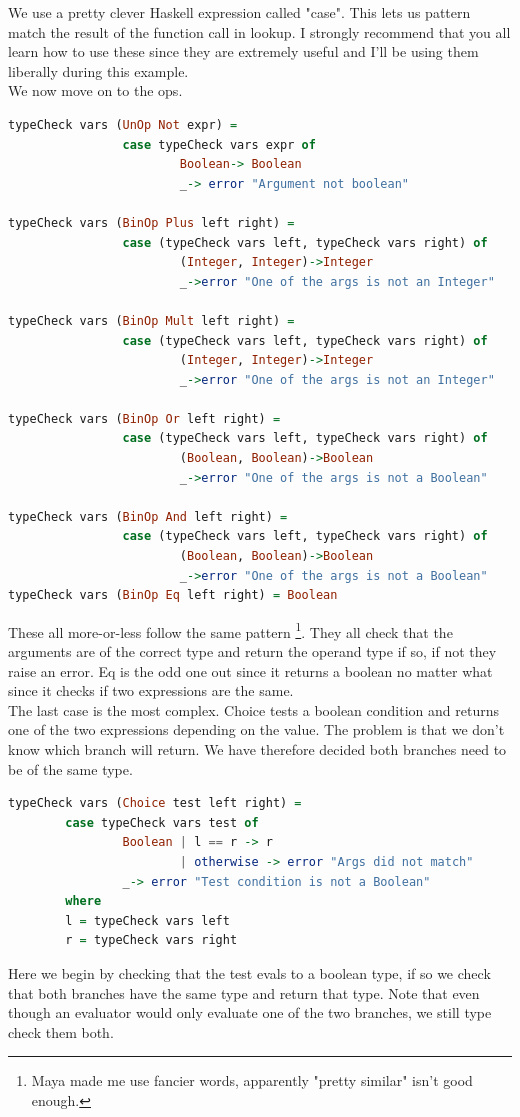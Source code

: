 \documentclass[tikz, border=5mm]{article}
\begin{document}
            We use a pretty clever Haskell expression called "case". This lets us pattern match the result of the function call in lookup. 
            I strongly recommend that you all learn how to use these since they are extremely useful and I'll be using them liberally during this example.\\
            We now move on to the ops. 
            \begin{lstlisting}[language=Haskell]
typeCheck vars (UnOp Not expr) = 
                case typeCheck vars expr of
                        Boolean-> Boolean 
                        _-> error "Argument not boolean"

typeCheck vars (BinOp Plus left right) = 
                case (typeCheck vars left, typeCheck vars right) of
                        (Integer, Integer)->Integer
                        _->error "One of the args is not an Integer"

typeCheck vars (BinOp Mult left right) = 
                case (typeCheck vars left, typeCheck vars right) of
                        (Integer, Integer)->Integer
                        _->error "One of the args is not an Integer"

typeCheck vars (BinOp Or left right) = 
                case (typeCheck vars left, typeCheck vars right) of
                        (Boolean, Boolean)->Boolean
                        _->error "One of the args is not a Boolean"

typeCheck vars (BinOp And left right) = 
                case (typeCheck vars left, typeCheck vars right) of
                        (Boolean, Boolean)->Boolean
                        _->error "One of the args is not a Boolean"
typeCheck vars (BinOp Eq left right) = Boolean
            \end{lstlisting}
            These all more-or-less follow the same pattern \footnote{Maya made me use fancier words, apparently "pretty similar" isn't good enough.}.
            They all check that the arguments are of the correct type and return the operand type if so, if not they raise an error.
            Eq is the odd one out since it returns a boolean no matter what since it checks if two expressions are the same.\\
            The last case is the most complex. Choice tests a boolean condition and returns one of the two expressions depending on the value.
            The problem is that we don't know which branch will return. We have therefore decided both branches need to be of the same type.
            \begin{lstlisting}[language=Haskell]
typeCheck vars (Choice test left right) = 
        case typeCheck vars test of
                Boolean | l == r -> r
                        | otherwise -> error "Args did not match"
                _-> error "Test condition is not a Boolean"
        where 
        l = typeCheck vars left
        r = typeCheck vars right
            \end{lstlisting}
            Here we begin by checking that the test evals to a boolean type, if so we check that both branches have the same type and return that type.
            Note that even though an evaluator would only evaluate one of the two branches, we still type check them both.
\end{document}
